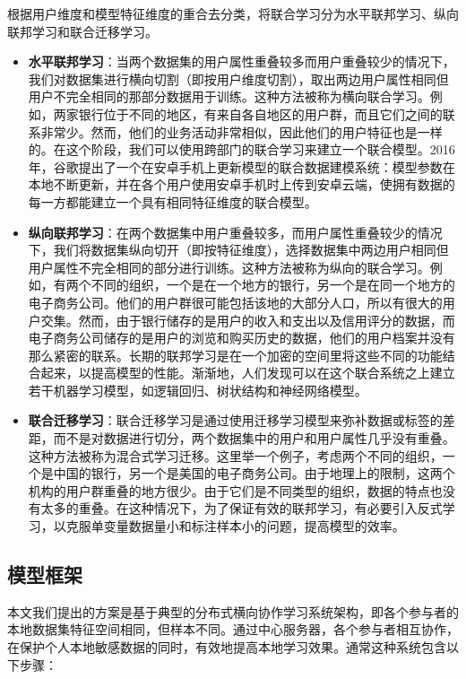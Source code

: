 根据用户维度和模型特征维度的重合去分类，将联合学习分为水平联邦学习、纵向联邦学习和联合迁移学习。
\begin{itemize}
\item \textbf{水平联邦学习}：当两个数据集的用户属性重叠较多而用户重叠较少的情况下，我们对数据集进行横向切割（即按用户维度切割），取出两边用户属性相同但用户不完全相同的那部分数据用于训练。这种方法被称为横向联合学习。例如，两家银行位于不同的地区，有来自各自地区的用户群，而且它们之间的联系非常少。然而，他们的业务活动非常相似，因此他们的用户特征也是一样的。在这个阶段，我们可以使用跨部门的联合学习来建立一个联合模型。2016年，谷歌提出了一个在安卓手机上更新模型的联合数据建模系统：模型参数在本地不断更新，并在各个用户使用安卓手机时上传到安卓云端，使拥有数据的每一方都能建立一个具有相同特征维度的联合模型。

\item \textbf{纵向联邦学习}：在两个数据集中用户重叠较多，而用户属性重叠较少的情况下，我们将数据集纵向切开（即按特征维度），选择数据集中两边用户相同但用户属性不完全相同的部分进行训练。这种方法被称为纵向的联合学习。例如，有两个不同的组织，一个是在一个地方的银行，另一个是在同一个地方的电子商务公司。他们的用户群很可能包括该地的大部分人口，所以有很大的用户交集。然而，由于银行储存的是用户的收入和支出以及信用评分的数据，而电子商务公司储存的是用户的浏览和购买历史的数据，他们的用户档案并没有那么紧密的联系。长期的联邦学习是在一个加密的空间里将这些不同的功能结合起来，以提高模型的性能。渐渐地，人们发现可以在这个联合系统之上建立若干机器学习模型，如逻辑回归、树状结构和神经网络模型。

\item \textbf{联合迁移学习}：联合迁移学习是通过使用迁移学习模型来弥补数据或标签的差距，而不是对数据进行切分，两个数据集中的用户和用户属性几乎没有重叠。这种方法被称为混合式学习迁移。这里举一个例子，考虑两个不同的组织，一个是中国的银行，另一个是美国的电子商务公司。由于地理上的限制，这两个机构的用户群重叠的地方很少。由于它们是不同类型的组织，数据的特点也没有太多的重叠。在这种情况下，为了保证有效的联邦学习，有必要引入反式学习，以克服单变量数据量小和标注样本小的问题，提高模型的效率。

\end{itemize}

\subsection{模型框架}
本文我们提出的方案是基于典型的分布式横向协作学习系统架构，即各个参与者的本地数据集特征空间相同，但样本不同。通过中心服务器，各个参与者相互协作，在保护个人本地敏感数据的同时，有效地提高本地学习效果。通常这种系统包含以下步骤：

